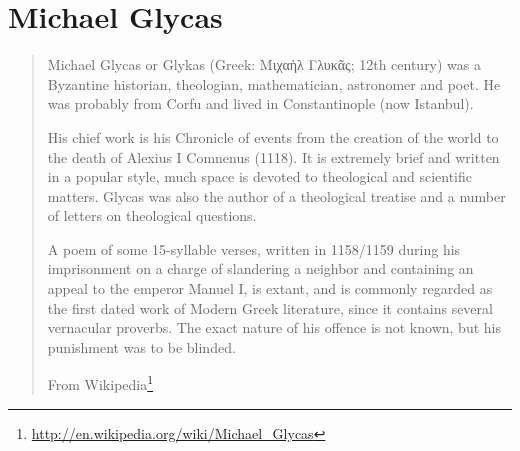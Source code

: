 \documentclass[12pt,letterpaper,twoside,final]{memoir}
\begin{document}
\section{Michael Glycas}
\blockquote[From Wikipedia\footnote{\url{http://en.wikipedia.org/wiki/Michael_Glycas}}]{Michael Glycas or Glykas (Greek: Μιχαὴλ Γλυκᾶς; 12th century) was a Byzantine historian, theologian, mathematician, astronomer and poet. He was probably from Corfu and lived in Constantinople (now Istanbul).

His chief work is his Chronicle of events from the creation of the world to the death of Alexius I Comnenus (1118). It is extremely brief and written in a popular style, much space is devoted to theological and scientific matters. Glycas was also the author of a theological treatise and a number of letters on theological questions.

A poem of some 15-syllable verses, written in 1158/1159 during his imprisonment on a charge of slandering a neighbor and containing an appeal to the emperor Manuel I, is extant, and is commonly regarded as the first dated work of Modern Greek literature, since it contains several vernacular proverbs. The exact nature of his offence is not known, but his punishment was to be blinded.}
\end{document}
